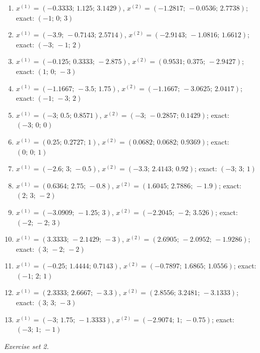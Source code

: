 \begin{enumerate}[label=\arabic*., leftmargin=*, itemsep=1pt]
\item $x^{(1)}=(-0.3333;\,1.125;\,3.1429)$, $x^{(2)}=(-1.2817;\,-0.0536;\,2.7738)$; exact: $(-1;\,0;\,3)$
\item $x^{(1)}=(-3.9;\,-0.7143;\,2.5714)$, $x^{(2)}=(-2.9143;\,-1.0816;\,1.6612)$; exact: $(-3;\,-1;\,2)$
\item $x^{(1)}=(-0.125;\,0.3333;\,-2.875)$, $x^{(2)}=(0.9531;\,0.375;\,-2.9427)$; exact: $(1;\,0;\,-3)$
\item $x^{(1)}=(-1.1667;\,-3.5;\,1.75)$, $x^{(2)}=(-1.1667;\,-3.0625;\,2.0417)$; exact: $(-1;\,-3;\,2)$
\item $x^{(1)}=(-3;\,0.5;\,0.8571)$, $x^{(2)}=(-3;\,-0.2857;\,0.1429)$; exact: $(-3;\,0;\,0)$
\item $x^{(1)}=(0.25;\,0.2727;\,1)$, $x^{(2)}=(0.0682;\,0.0682;\,0.9369)$; exact: $(0;\,0;\,1)$
\item $x^{(1)}=(-2.6;\,3;\,-0.5)$, $x^{(2)}=(-3.3;\,2.4143;\,0.92)$; exact: $(-3;\,3;\,1)$
\item $x^{(1)}=(0.6364;\,2.75;\,-0.8)$, $x^{(2)}=(1.6045;\,2.7886;\,-1.9)$; exact: $(2;\,3;\,-2)$
\item $x^{(1)}=(-3.0909;\,-1.25;\,3)$, $x^{(2)}=(-2.2045;\,-2;\,3.526)$; exact: $(-2;\,-2;\,3)$
\item $x^{(1)}=(3.3333;\,-2.1429;\,-3)$, $x^{(2)}=(2.6905;\,-2.0952;\,-1.9286)$; exact: $(3;\,-2;\,-2)$
\item $x^{(1)}=(-0.25;\,1.4444;\,0.7143)$, $x^{(2)}=(-0.7897;\,1.6865;\,1.0556)$; exact: $(-1;\,2;\,1)$
\item $x^{(1)}=(2.3333;\,2.6667;\,-3.3)$, $x^{(2)}=(2.8556;\,3.2481;\,-3.1333)$; exact: $(3;\,3;\,-3)$
\item $x^{(1)}=(-3;\,1.75;\,-1.3333)$, $x^{(2)}=(-2.9074;\,1;\,-0.75)$; exact: $(-3;\,1;\,-1)$
\end{enumerate}
\par\noindent\emph{Exercise set 2.}\nopagebreak
